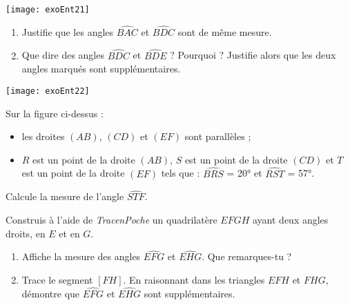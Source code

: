 \newpage
\begin{exercice}
                        
\begin{center}
    \texttt{[image: exoEnt21]}
\end{center}
                                 
\begin{enumerate}
\item Justifie que les angles $\widehat{BAC}$ et $\widehat{BDC}$ sont de même mesure.
\item Que dire des angles $\widehat{BDC}$ et $\widehat{BDE}$ ? Pourquoi ? Justifie alors que les deux angles marqués sont supplémentaires.
\end{enumerate}
\end{exercice}

\columnbreak
\begin{exercice}[Zigzag]

\begin{center}
    \texttt{[image: exoEnt22]}
\end{center}

Sur la figure ci-dessus :
\begin{itemize}
    \item les droites $(AB)$, $(CD)$ et $(EF)$ sont parallèles ;
    \item $R$ est un point de la droite $(AB)$, $S$ est un point de la droite $(CD)$ et $T$ est un point de la droite $(EF)$ tels que : $\widehat{BRS}$ = 20° et $\widehat{RST}$ = 57°.
\end{itemize}

Calcule la mesure de l'angle $\widehat{STF}$.
\end{exercice}


\begin{exercice}
Construis à l'aide de \emph{TracenPoche} un quadrilatère $EFGH$ ayant deux angles droits, en $E$ et en $G$.
\begin{enumerate}
\item Affiche la mesure des angles $\widehat{EFG}$ et $\widehat{EHG}$. Que remarques-tu ?
\item Trace le segment $[FH]$. En raisonnant dans les triangles $EFH$ et $FHG$, démontre que $\widehat{EFG}$ et $\widehat{EHG}$ sont supplémentaires.
\end{enumerate}
\end{exercice}
